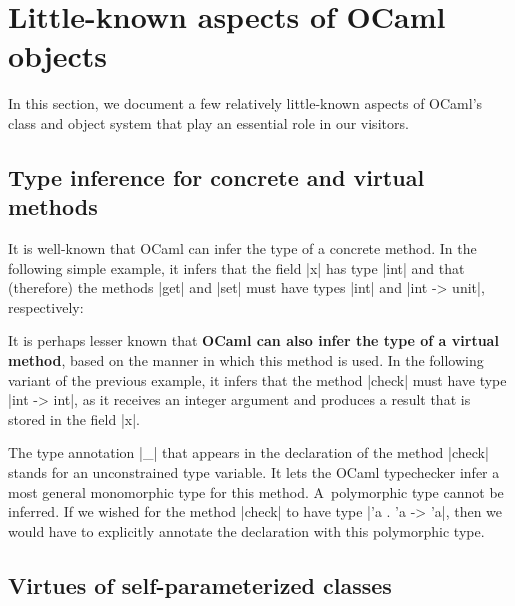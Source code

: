 \documentclass[11pt,a4paper,twoside]{article}
\renewcommand{\emph}[1]{\textbf{#1}}
\begin{document}

\section{Little-known aspects of OCaml objects}
\label{sec:oo}

In this section, we document a few relatively little-known aspects of OCaml's
class and object system that play an essential role in our visitors.


\subsection{Type inference for concrete and virtual methods}
\label{sec:oo:infer}

It is well-known that OCaml can infer the type of a concrete method. In the
following simple example, it infers that the field \oc|x| has type \oc|int|
and that (therefore) the methods \oc|get| and \oc|set| must have types
\oc|int| and \oc|int -> unit|, respectively:
%

It is perhaps lesser known that \emph{OCaml can also infer the type of a
  virtual method}, based on the manner in which this method is used. In the
following variant of the previous example, it infers that the method
\oc|check| must have type \oc|int -> int|, as it receives an integer argument
and produces a result that is stored in the field \oc|x|.
%

The type annotation \oc|_| that appears in the declaration of the method
\oc|check| stands for an unconstrained type variable. It lets the OCaml
typechecker infer a most general monomorphic type for this method.
A~polymorphic type cannot be inferred. If we wished for the method \oc|check|
to have type \oc|'a . 'a -> 'a|, then we would have to explicitly annotate the
declaration with this polymorphic type.


\subsection{Virtues of self-parameterized classes}
\label{sec:oo:self}
\end{document}
